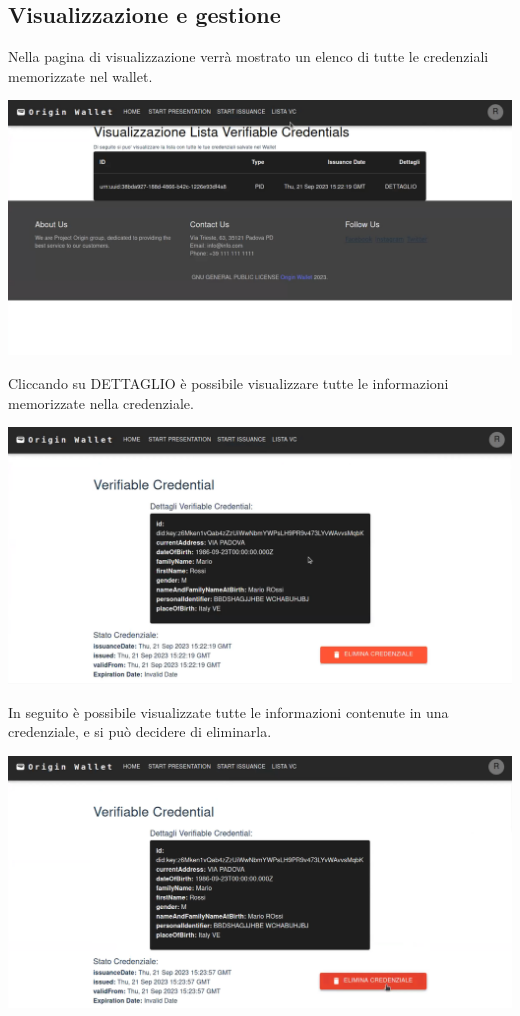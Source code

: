 \subsection{Visualizzazione e gestione}
Nella pagina di visualizzazione verrà mostrato un elenco di tutte le credenziali memorizzate nel wallet. \newline
\begin{center}
\includegraphics[scale = 0.9]{./res/img/wallet/wallet_credentials_list.png}
\end{center}
Cliccando su DETTAGLIO è possibile visualizzare tutte le informazioni memorizzate nella credenziale. \\
\begin{center}
\includegraphics[scale = 0.9]{./res/img/wallet/wallet_credential_detail.png}
\end{center}
In seguito è possibile visualizzate tutte le informazioni contenute in una credenziale, e si può decidere di eliminarla.
\begin{center}
\includegraphics[scale = 0.9]{./res/img/wallet/wallet_credential_delete.png}
\end{center}
